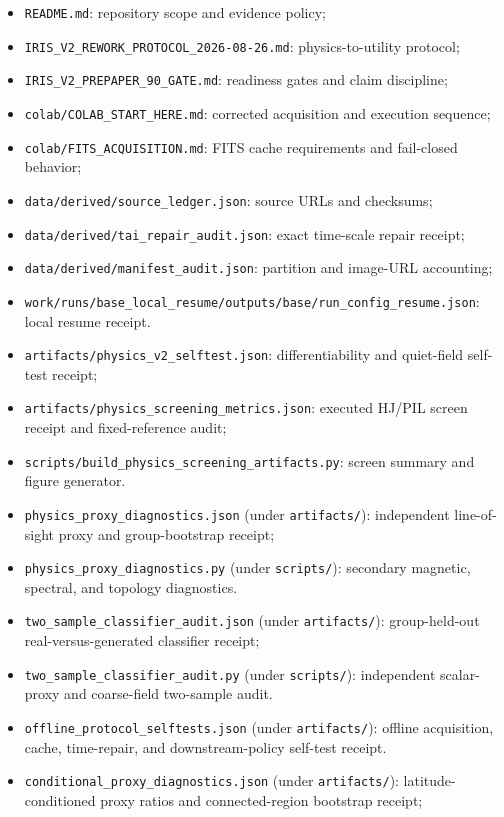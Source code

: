 \documentclass[11pt,oneside]{report}
\begin{document}
\begin{itemize}
\item \texttt{README.md}: repository scope and evidence policy;
\item \texttt{IRIS\_V2\_REWORK\_PROTOCOL\_2026-08-26.md}: physics-to-utility protocol;
\item \texttt{IRIS\_V2\_PREPAPER\_90\_GATE.md}: readiness gates and claim discipline;
\item \texttt{colab/COLAB\_START\_HERE.md}: corrected acquisition and execution sequence;
\item \texttt{colab/FITS\_ACQUISITION.md}: FITS cache requirements and fail-closed behavior;
\item \texttt{data/derived/source\_ledger.json}: source URLs and checksums;
\item \texttt{data/derived/tai\_repair\_audit.json}: exact time-scale repair receipt;
\item \texttt{data/derived/manifest\_audit.json}: partition and image-URL accounting;
\item \texttt{work/runs/base\_local\_resume/outputs/base/run\_config\_resume.json}: local resume receipt.
\item \texttt{artifacts/physics\_v2\_selftest.json}: differentiability and quiet-field self-test receipt;
\item \texttt{artifacts/physics\_screening\_metrics.json}: executed HJ/PIL screen receipt and fixed-reference audit;
\item \texttt{scripts/build\_physics\_screening\_artifacts.py}: screen summary and figure generator.
\item \texttt{physics\_proxy\_diagnostics.json} (under \texttt{artifacts/}): independent line-of-sight proxy and group-bootstrap receipt;
\item \texttt{physics\_proxy\_diagnostics.py} (under \texttt{scripts/}): secondary magnetic, spectral, and topology diagnostics.
\item \texttt{two\_sample\_classifier\_audit.json} (under \texttt{artifacts/}): group-held-out real-versus-generated classifier receipt;
\item \texttt{two\_sample\_classifier\_audit.py} (under \texttt{scripts/}): independent scalar-proxy and coarse-field two-sample audit.
\item \texttt{offline\_protocol\_selftests.json} (under \texttt{artifacts/}): offline acquisition, cache, time-repair, and downstream-policy self-test receipt.
\item \texttt{conditional\_proxy\_diagnostics.json} (under \texttt{artifacts/}): latitude-conditioned proxy ratios and connected-region bootstrap receipt;

\end{itemize}
\end{document}
